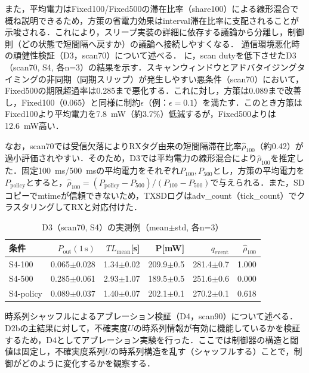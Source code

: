 また，平均電力はFixed100/Fixed500の滞在比率（share100）による線形混合で概ね説明できるため，方策の省電力効果はinterval滞在比率に支配されることが示唆される．これにより，スリープ実装の詳細に依存する議論から分離し，制御則（どの状態で短間隔へ戻すか）の議論へ接続しやすくなる．
\noindent 通信環境悪化時の頑健性検証（D3，scan70）について述べる．
\label{sec:d3_scan70}
に，scan dutyを低下させたD3（scan70, S4, 各n=3）の結果を示す．スキャンウィンドウとアドバタイジングタイミングの非同期（同期スリップ）が発生しやすい悪条件（scan70）において，Fixed500の期限超過率は0.285まで悪化する．これに対し，方策は0.089まで改善し，Fixed100（0.065）と同様に制約$\epsilon$（例：$\epsilon=0.1$）を満たす．このとき方策はFixed100より平均電力を\SI{7.8}{\milli\watt}（約3.7\%）低減するが，Fixed500よりは\SI{12.6}{\milli\watt}高い．

なお，scan70では受信欠落によりRXタグ由来の短間隔滞在比率$\hat{\rho}_{100}$（約0.42）が過小評価されやすい．そのため，D3では平均電力の線形混合により$\hat{\rho}_{100}$を推定した．固定\SI{100}{\milli\second}/\SI{500}{\milli\second}の平均電力をそれぞれ$P_{100}, P_{500}$とし，方策の平均電力を$P_{\mathrm{policy}}$とすると，$\hat{\rho}_{100}=(P_{\mathrm{policy}}-P_{500})/(P_{100}-P_{500})$で与えられる．また，SDコピーでmtimeが信頼できないため，TXSDログはadv\_count（tick\_count）でクラスタリングしてRXと対応付けた．

\begin{table}[tb]
  \centering
  \caption{D3（scan70, S4）の実測例（mean$\pm$std, 各n=3）}
  \label{tab:d3_summary}
  {\small
  \setlength{\tabcolsep}{4pt}
  \begin{tabular}{lrrrrr}
    \toprule
    条件 & $P_{\mathrm{out}}(1\,\mathrm{s})$ & $TL_{\mathrm{mean}}$[s] & P[mW] & $q_{\mathrm{event}}$ & $\hat{\rho}_{100}$ \\
    \midrule
    S4-100   & 0.065$\pm$0.028 & 1.34$\pm$0.02 & 209.9$\pm$0.5 & 281.4$\pm$0.7 & 1.000 \\
    S4-500   & 0.285$\pm$0.061 & 2.93$\pm$1.07 & 189.5$\pm$0.5 & 251.6$\pm$0.6 & 0.000 \\
    S4-policy & 0.089$\pm$0.037 & 1.40$\pm$0.07 & 202.1$\pm$0.1 & 270.2$\pm$0.1 & 0.618 \\
    \bottomrule
  \end{tabular}
  }
\end{table}
\noindent 時系列シャッフルによるアブレーション検証（D4，scan90）について述べる．
\label{sec:d4_ablation}
D2bの主結果に対して，不確実度$U$の時系列情報が有効に機能しているかを検証するため，D4としてアブレーション実験を行った．ここでは制御器の構造と閾値は固定し，不確実度系列$U$の時系列構造を乱す（シャッフルする）ことで，制御がどのように変化するかを観察する．

